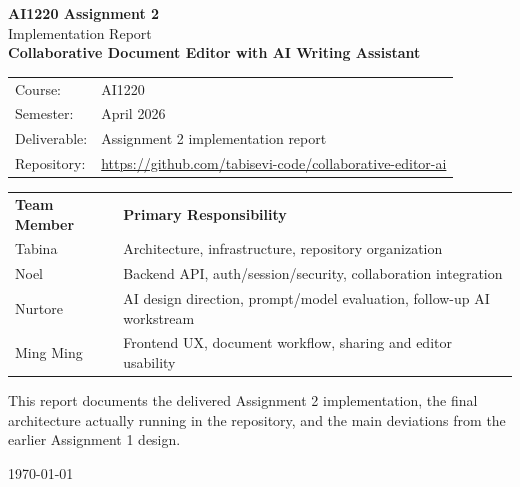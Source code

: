 \begin{titlepage}
  \centering
  \vspace*{2cm}

  {\Huge \textbf{AI1220 Assignment 2}}\\[0.5cm]
  {\LARGE Implementation Report}\\[1cm]
  {\Large \textbf{Collaborative Document Editor with AI Writing Assistant}}\\[1.2cm]

  \begin{tabular}{ll}
    Course: & AI1220 \\
    Semester: & April 2026 \\
    Deliverable: & Assignment 2 implementation report \\
    Repository: & \url{https://github.com/tabisevi-code/collaborative-editor-ai}
  \end{tabular}

  \vfill

  \begin{tabular}{ll}
    \textbf{Team Member} & \textbf{Primary Responsibility} \\
    Tabina & Architecture, infrastructure, repository organization \\
    Noel & Backend API, auth/session/security, collaboration integration \\
    Nurtore & AI design direction, prompt/model evaluation, follow-up AI workstream \\
    Ming Ming & Frontend UX, document workflow, sharing and editor usability
  \end{tabular}

  \vfill

  \begin{minipage}{0.9\textwidth}
    \small
    This report documents the delivered Assignment 2 implementation, the final architecture actually
    running in the repository, and the main deviations from the earlier Assignment 1 design.
  \end{minipage}

  \vfill
  {\large \today}
\end{titlepage}

\clearpage
